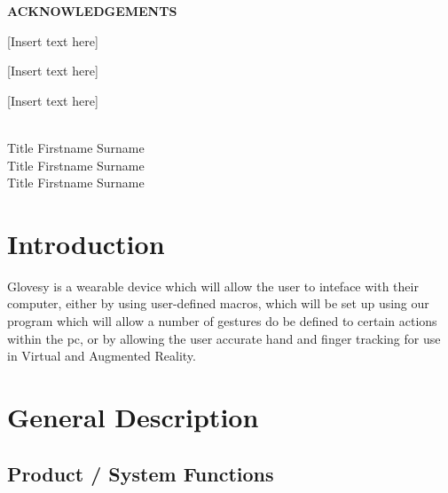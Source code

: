 \documentclass[12pt,a4paper,oneside]{book}
\theoremstyle{plain}
\numberwithin{equation}{chapter}
\renewcommand{\contentsname}{\hfill\bfseries\Large TABLE OF CONTENTS \hfill}
\begin{document}
\newpage
\begin{center}
	\large\textbf{ACKNOWLEDGEMENTS} \\
\end{center}

[Insert text here]

[Insert text here]

[Insert text here]\\\\

\begin{flushright}
    Title Firstname Surname\\
    Title Firstname Surname\\
    Title Firstname Surname\\
\end{flushright}


\newpage

\tableofcontents
%


\newpage
{}
\listoffigures

\newpage
{}
\chapter*{Introduction}

\noindent Glovesy is a wearable device which will allow the user to inteface with their computer, either by using user-defined macros, which will be set up using our program which will allow a number of gestures do be defined to certain actions within the pc, or by allowing the user accurate hand and finger tracking for use in Virtual and Augmented Reality.
\vspace{2cm}

\chapter*{General Description}

\section{Product / System Functions}
\end{document}
